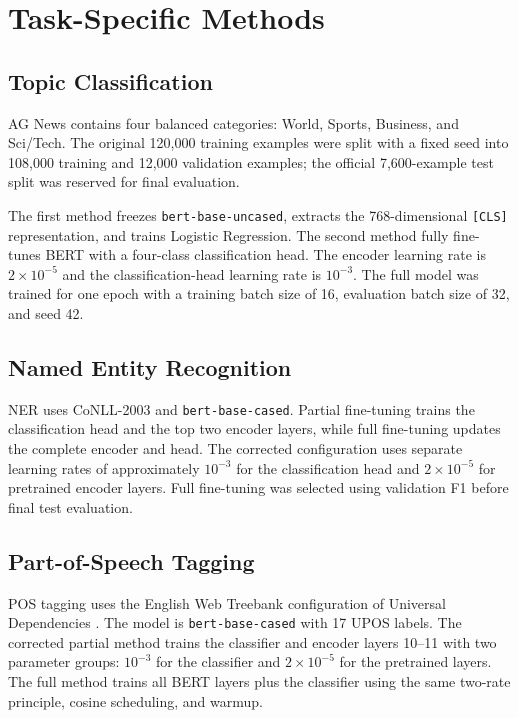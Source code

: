 \documentclass[conference]{IEEEtran}
\begin{document}
\section{Task-Specific Methods}

\subsection{Topic Classification}
AG News contains four balanced categories: World, Sports, Business, and Sci/Tech. The original 120,000 training examples were split with a fixed seed into 108,000 training and 12,000 validation examples; the official 7,600-example test split was reserved for final evaluation.

The first method freezes \texttt{bert-base-uncased}, extracts the 768-dimensional \texttt{[CLS]} representation, and trains Logistic Regression. The second method fully fine-tunes BERT with a four-class classification head. The encoder learning rate is $2\times10^{-5}$ and the classification-head learning rate is $10^{-3}$. The full model was trained for one epoch with a training batch size of 16, evaluation batch size of 32, and seed 42.

\subsection{Named Entity Recognition}
NER uses CoNLL-2003 \cite{tjong2003conll} and \texttt{bert-base-cased}. Partial fine-tuning trains the classification head and the top two encoder layers, while full fine-tuning updates the complete encoder and head. The corrected configuration uses separate learning rates of approximately $10^{-3}$ for the classification head and $2\times10^{-5}$ for pretrained encoder layers. Full fine-tuning was selected using validation F1 before final test evaluation.

\subsection{Part-of-Speech Tagging}
POS tagging uses the English Web Treebank configuration of Universal Dependencies \cite{nivre2020ud}. The model is \texttt{bert-base-cased} with 17 UPOS labels. The corrected partial method trains the classifier and encoder layers 10--11 with two parameter groups: $10^{-3}$ for the classifier and $2\times10^{-5}$ for the pretrained layers. The full method trains all BERT layers plus the classifier using the same two-rate principle, cosine scheduling, and warmup.
\end{document}
